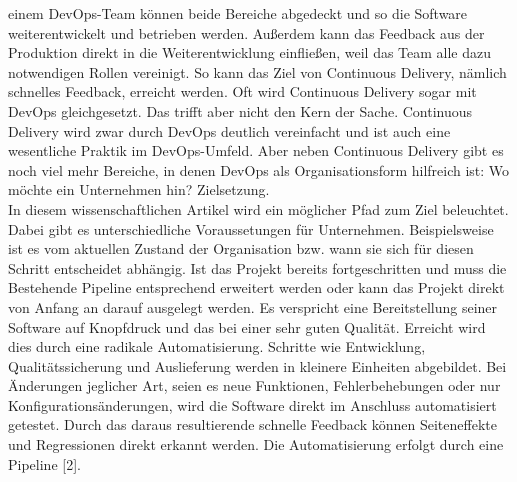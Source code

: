  einem DevOps-Team können beide Bereiche abgedeckt und so die Software weiterentwickelt und betrieben werden. Außerdem kann das Feedback aus der Produktion direkt in die Weiterentwicklung einfließen, weil das Team alle dazu notwendigen Rollen vereinigt. So kann das Ziel von Continuous Delivery, nämlich schnelles Feedback, erreicht werden. Oft wird Continuous Delivery sogar mit DevOps gleichgesetzt. Das trifft aber nicht den Kern der Sache. Continuous Delivery wird zwar durch DevOps deutlich vereinfacht und ist auch eine wesentliche Praktik im DevOps-Umfeld. Aber neben Continuous Delivery gibt es noch viel mehr Bereiche, in denen DevOps als Organisationsform hilfreich ist: Wo möchte ein Unternehmen hin? Zielsetzung. \\In diesem wissenschaftlichen Artikel wird ein möglicher Pfad zum Ziel beleuchtet. Dabei gibt es unterschiedliche Voraussetungen für Unternehmen. Beispielsweise ist es vom aktuellen Zustand der Organisation bzw. wann sie sich für diesen Schritt entscheidet abhängig. Ist das Projekt bereits fortgeschritten und muss die Bestehende Pipeline entsprechend erweitert werden oder kann das Projekt direkt von Anfang an darauf ausgelegt werden.
Es verspricht eine Bereitstellung seiner Software auf Knopfdruck und das bei einer sehr guten Qualität. Erreicht wird dies durch eine radikale Automatisierung. Schritte wie Entwicklung, Qualitätssicherung und Auslieferung werden in kleinere Einheiten abgebildet. Bei Änderungen jeglicher Art, seien es neue Funktionen, Fehlerbehebungen oder nur Konfigurationsänderungen, wird die Software direkt im Anschluss automatisiert getestet. Durch das daraus resultierende schnelle Feedback können Seiteneffekte und Regressionen direkt erkannt werden. Die Automatisierung erfolgt durch eine Pipeline [2]. 

